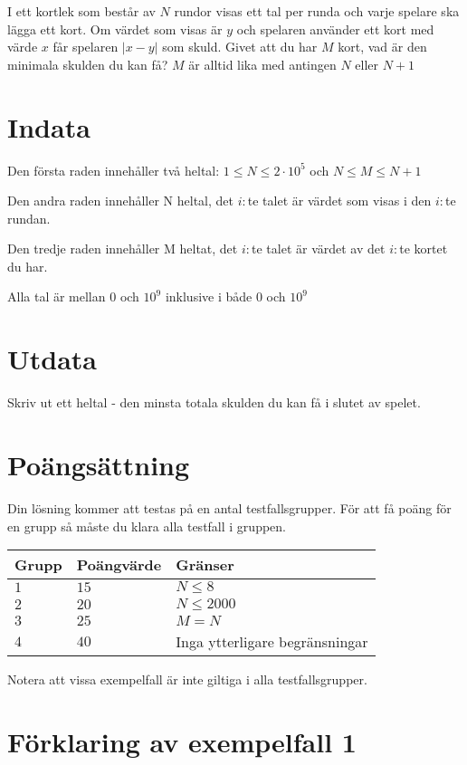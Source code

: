 I ett kortlek som består av $N$ rundor visas ett tal per runda och varje spelare ska lägga ett kort. Om värdet som visas är $y$ och spelaren använder ett kort med värde $x$ får spelaren $|x-y|$ som skuld. Givet att du har $M$ kort, vad är den minimala skulden du kan få? $M$ är alltid lika med antingen $N$ eller $N+1$



\section*{Indata}
Den första raden innehåller två heltal: $1\leq N \leq 2 \cdot 10^5$ och $N\leq M \leq N+1$

Den andra raden innehåller N heltal, det $i:$te talet är värdet som visas i den $i:$te rundan.

Den tredje raden innehåller M heltat, det $i:$te talet är värdet av det $i:$te kortet du har.

Alla tal är mellan $0$ och $10^9$ inklusive i både $0$ och $10^9$

\section*{Utdata}
Skriv ut ett heltal - den minsta totala skulden du kan få i slutet av spelet.

\section*{Poängsättning}
Din lösning kommer att testas på en antal testfallsgrupper.
För att få poäng för en grupp så måste du klara alla testfall i gruppen.

\noindent
\begin{tabular}{| l | l | p{12cm} |}
  \hline
  Grupp & Poängvärde & Gränser \\ \hline
  $1$   & $15$       & $N \leq 8 $\\ \hline
  $2$   & $20$       & $N \leq 2000 $  \\ \hline
  $3$   & $25$       & $M=N$ \\ \hline
  $4$   & $40$       & Inga ytterligare begränsningar \\ \hline
\end{tabular}

Notera att vissa exempelfall är inte giltiga i alla testfallsgrupper.

\section*{Förklaring av exempelfall 1}

